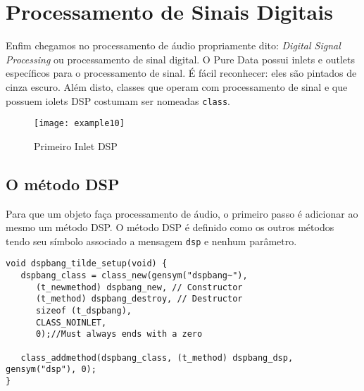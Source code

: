 \chapter{Processamento de Sinais Digitais}


Enfim chegamos no processamento de áudio propriamente dito: \emph{Digital
Signal Processing} ou processamento de sinal digital.
O Pure Data possui inlets e outlets específicos para o processamento de sinal.
É fácil reconhecer: eles são pintados de cinza escuro.
Além disto, classes que operam com processamento de sinal e que possuem iolets
DSP costumam ser nomeadas \texttt{class\til}.

\begin{figure}[h!]
\centering
\texttt{[image: example10]}
\caption{Primeiro Inlet DSP}
\end{figure}

\section{O método DSP}

Para que um objeto faça processamento de áudio, o primeiro passo é adicionar ao
mesmo um método DSP.
O método DSP é definido como os outros métodos tendo seu símbolo associado a
mensagem \texttt{dsp} e nenhum parâmetro.

\begin{lstlisting}[caption=Adicionando um método para DSP]
void dspbang_tilde_setup(void) {
   dspbang_class = class_new(gensym("dspbang~"),
      (t_newmethod) dspbang_new, // Constructor
      (t_method) dspbang_destroy, // Destructor
      sizeof (t_dspbang),
      CLASS_NOINLET,
      0);//Must always ends with a zero

   class_addmethod(dspbang_class, (t_method) dspbang_dsp, gensym("dsp"), 0);
}
\end{lstlisting}

